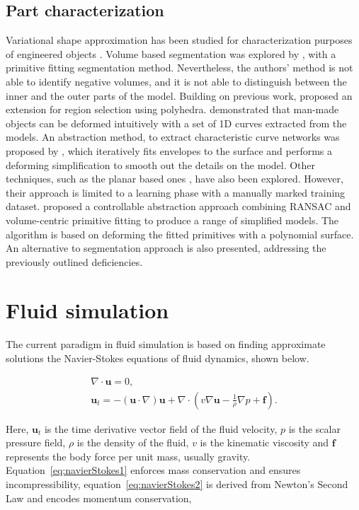 \subsection{Part characterization}

Variational shape approximation has been studied for characterization purposes of engineered objects \cite{Cohen-Steiner2004}.
Volume based segmentation was explored by \cite{Attene2006}, with a primitive fitting segmentation method.
Nevertheless, the authors' method is not able to identify negative volumes, and it is not able to distinguish between the inner and the outer parts of the model.
Building on previous work, \cite{Attene2008} proposed an extension for region selection using polyhedra.
\cite{Gal2009} demonstrated that man-made objects can be deformed intuitively with a set of 1D curves extracted from the models.
An abstraction method, to extract characteristic curve networks was proposed by \cite{Mehra2009}, which iteratively fits envelopes to the surface and performs a deforming simplification to smooth out the details on the model.
Other techniques, such as the planar based ones \cite{McCrae2011}, have also been explored.
However, their approach is limited to a learning phase with a manually marked training dataset.
\cite{Yumer2012} proposed a controllable abstraction approach combining RANSAC and volume-centric primitive fitting to produce a range of simplified models.
The algorithm is based on deforming the fitted primitives with a polynomial surface.
An alternative to \cite{Attene2006} segmentation approach is also presented, addressing the previously outlined deficiencies.

\section{Fluid simulation}
\label{prevWorkFluidSim}

The current paradigm in fluid simulation is based on finding approximate solutions the Navier-Stokes equations of fluid dynamics, shown below.

\begin{gather}
\label{eq:navierStokes1}
\nabla \cdot \mathbf{u} = 0,\\
\label{eq:navierStokes2}
\mathbf{u}_t = -(\mathbf{u} \cdot \nabla)\mathbf{u} + \nabla \cdot ( v \nabla \mathbf{u} - \frac{1}{\rho} \nabla p + \mathbf{f} ).
\end{gather}

Here, $\mathbf{u}_t$ is the time derivative vector field of the fluid velocity, $p$  is the scalar pressure field, $\rho$ is the density of the fluid, $v$ is the kinematic viscosity and $\mathbf{f}$ represents the body force per unit mass, usually gravity.
Equation~\ref{eq:navierStokes1} enforces mass conservation and ensures incompressibility, equation~\ref{eq:navierStokes2} is derived from Newton's Second Law and encodes momentum conservation, 

